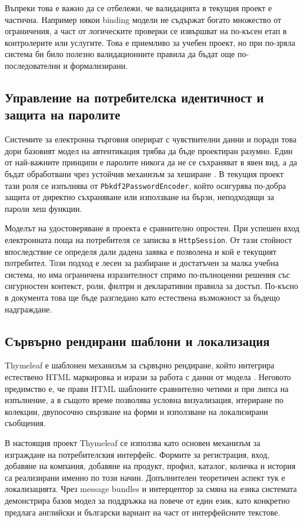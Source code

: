 Въпреки това е важно да се отбележи, че валидацията в текущия проект е частична. Например някои binding модели не съдържат богато множество от ограничения, а част от логическите проверки се извършват на по-късен етап в контролерите или услугите. Това е приемливо за учебен проект, но при по-зряла система би било полезно валидационните правила да бъдат още по-последователни и формализирани.

\subsection{Управление на потребителска идентичност и защита на паролите}

Системите за електронна търговия оперират с чувствителни данни и поради това дори базовият модел на автентикация трябва да бъде проектиран разумно. Един от най-важните принципи е паролите никога да не се съхраняват в явен вид, а да бъдат обработвани чрез устойчив механизъм за хеширане \cite{springsecuritycrypto,owasp}. В текущия проект тази роля се изпълнява от \texttt{Pbkdf2PasswordEncoder}, който осигурява по-добра защита от директно съхраняване или използване на бързи, неподходящи за пароли хеш функции.

Моделът на удостоверяване в проекта е сравнително опростен. При успешен вход електронната поща на потребителя се записва в \texttt{HttpSession}. От тази стойност впоследствие се определя дали дадена заявка е позволена и кой е текущият потребител. Този подход е лесен за разбиране и достатъчен за малка учебна система, но има ограничена изразителност спрямо по-пълноценни решения със сигурностен контекст, роли, филтри и декларативни правила за достъп. По-късно в документа това ще бъде разгледано като естествена възможност за бъдещо надграждане.

\subsection{Сървърно рендирани шаблони и локализация}

Thymeleaf е шаблонен механизъм за сървърно рендиране, който интегрира естествено HTML маркировка и изрази за работа с данни от модела \cite{thymeleaf}. Неговото предимство е, че прави HTML шаблоните сравнително четими и при липса на изпълнение, а в същото време позволява условна визуализация, итериране по колекции, двупосочно свързване на форми и използване на локализирани съобщения.

В настоящия проект Thymeleaf се използва като основен механизъм за изграждане на потребителския интерфейс. Формите за регистрация, вход, добавяне на компания, добавяне на продукт, профил, каталог, количка и история са реализирани именно по този начин. Допълнителен теоретичен аспект тук е локализацията. Чрез message bundles и интерцептор за смяна на езика системата демонстрира базов модел за поддръжка на повече от един език, като конкретно предлага английски и български вариант на част от интерфейсните текстове.

